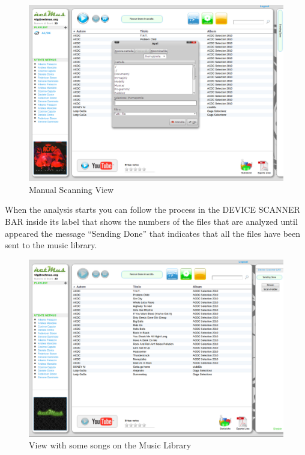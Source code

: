 \begin{figure}[htbp]
  \centering
  \includegraphics[width=15cm]{img/MU/scan_manual.png}
\caption{Manual Scanning View}
\end{figure}

When the analysis starts you can follow the process in the DEVICE SCANNER BAR
inside its label that shows the numbers of the files that are analyzed until
appeared the message ``Sending Done'' that indicates that all the files have
been sent to the music library.\\

\begin{figure}[htbp]
  \centering
  \includegraphics[width=15cm]{img/MU/song_loaded.png}
\caption{View with some songs on the Music Library}
\end{figure}

